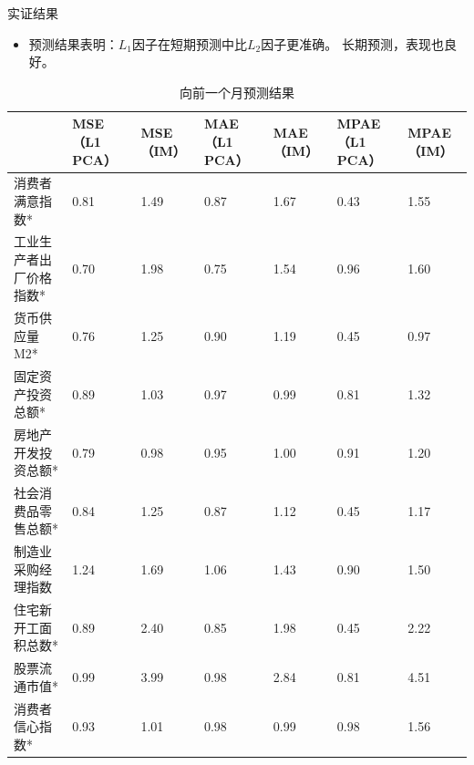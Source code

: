 \begin{frame}{实证结果}
    \begin{itemize}
        \item
        预测结果表明：$L_1$因子在短期预测中比$L_2$因子更准确。
        长期预测，表现也良好。
    \end{itemize}
    \begin{table}[H]
        \tiny
        \caption{向前一个月预测结果}
        \label{outcome1}
        \centering
        \begin{tabularx}{\textwidth}{lXXXXXX}
        \toprule
                         &  MSE（L1 PCA） &  MSE（IM） &  MAE（L1 PCA） &  MAE（IM） &  MPAE（L1 PCA） &  MPAE（IM） \\ \midrule
        消费者满意指数*     & 0.81            & 1.49        & 0.87            & 1.67        & 0.43             & 1.55         \\
        工业生产者出厂价格指数* & 0.70            & 1.98        & 0.75            & 1.54        & 0.96             & 1.60         \\
        货币供应量M2*      & 0.76            & 1.25        & 0.90            & 1.19        & 0.45             & 0.97         \\
        固定资产投资总额*  & 0.89            & 1.03        & 0.97            & 0.99        & 0.81             & 1.32         \\
        房地产开发投资总额* & 0.79            & 0.98        & 0.95            & 1.00        & 0.91             & 1.20         \\
        社会消费品零售总额* & 0.84            & 1.25        & 0.87            & 1.12        & 0.45             & 1.17         \\
        制造业采购经理指数    & 1.24           & 1.69        & 1.06            & 1.43        & 0.90             & 1.50         \\
        住宅新开工面积总数*  & 0.89            & 2.40        & 0.85            & 1.98        & 0.45             & 2.22         \\
        股票流通市值*      & 0.99            & 3.99        & 0.98            & 2.84        & 0.81             & 4.51         \\
        消费者信心指数*     & 0.93            & 1.01        & 0.98            & 0.99        & 0.98             & 1.56         \\ \bottomrule
        \end{tabularx}
    \end{table}
\end{frame}